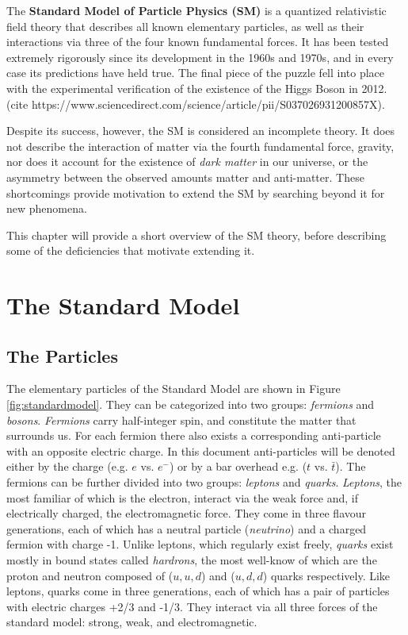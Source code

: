 \label{chapter:theory}

\newlength{\savedunitlength}
\setlength{\unitlength}{2em}

The \textbf{Standard Model of Particle Physics (SM)} is a quantized relativistic field theory that describes all known elementary particles, as well as their interactions via three of the four known fundamental forces. It has been tested extremely rigorously since its development in the 1960s and 1970s, and in every case its predictions have held true. The final piece of the puzzle fell into place with the experimental verification of the existence of the Higgs Boson in 2012. (cite https://www.sciencedirect.com/science/article/pii/S037026931200857X).

Despite its success, however, the SM is considered an incomplete theory. It does not describe the interaction of matter via the fourth fundamental force, gravity, nor does it account for the existence of \textit{dark matter} in our universe, or the asymmetry between the observed amounts matter and anti-matter. These shortcomings provide motivation to extend the SM by searching beyond it for new phenomena.

This chapter will provide a short overview of the SM theory, before describing some of the deficiencies that motivate extending it.

\section{The Standard Model}

\subsection{The Particles}
The elementary particles of the Standard Model are shown in Figure \ref{fig:standardmodel}. They can be categorized into two groups: \textit{fermions} and \textit{bosons}. \textit{Fermions} carry half-integer spin, and constitute the matter that surrounds us. For each fermion there also exists a corresponding anti-particle with an opposite electric charge. In this document anti-particles will be denoted either by the charge (e.g. $e$ vs. $e^{-}$) or by a bar overhead e.g. ($t$ vs. $\bar{t}$). The fermions can be further divided into two groups: \textit{leptons} and \textit{quarks}. \textit{Leptons}, the most familiar of which is the electron, interact via the weak force and, if electrically charged, the electromagnetic force. They come in three flavour generations, each of which has a neutral particle (\textit{neutrino}) and a charged fermion with charge -1. Unlike leptons, which regularly exist freely, \textit{quarks} exist mostly in bound states called \textit{hardrons}, the most well-know of which are the proton and neutron composed of ($u,u,d$) and ($u,d,d$) quarks respectively. Like leptons, quarks come in three generations, each of which has a pair of particles with electric charges +2/3 and -1/3. They interact via all three forces of the standard model: strong, weak, and electromagnetic.

